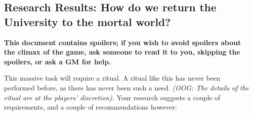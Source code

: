\documentclass[white]{gl2018}
\begin{document}
\name{\wWinterRitual{}}
\begin{center}
\section*{Research Results: How do we return the University to the mortal world?}
\end{center}

{\bf This document contains spoilers; if you wish to avoid spoilers about the climax of the game, ask someone to read it to you, skipping the spoilers, or ask a GM for help.}

This massive task will require a ritual. A ritual like this has never been performed before, as there has never been such a need. \emph{(OOG: The details of the ritual are at the players’ discretion).} Your research suggests a couple of requirements, and a couple of recommendations however:
\end{document}
